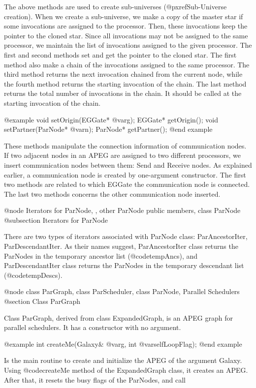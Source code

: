 The above methods are used to create sub-universes 
(@pxref{Sub-Universe creation}). When we create a sub-universe, we make a
copy of the master star if some invocations are assigned to the processor.
Then, these invocations keep the pointer to the cloned star. Since
all invocations may not be assigned to the same processor, we maintain
the list of invocations assigned to the given processor. The first and
second methods set and get the pointer to the cloned star. The first method
also make a chain of the invocations assigned to the same processor.
The third method returns the next invocation chained from the current node,
while the fourth method returns the starting invocation of the chain. The
last method returns the total number of invocations in the chain. It should
be called at the starting invocation of the chain.

@example
void setOrigin(EGGate* @var{g});
EGGate* getOrigin();
void setPartner(ParNode* @var{n});
ParNode* getPartner();
@end example

These methods manipulate the connection information of communication nodes.
If two adjacent nodes in an APEG are assigned to two different processors,
we insert communication nodes between them: Send and Receive nodes. As
explained earlier, a communication node is created by one-argument
constructor. The
first two methods are related to which EGGate the communication node is
connected. The last two methods concerns the other communication node
inserted.

@node Iterators for ParNode, , other ParNode public members, class ParNode
@subsection Iterators for ParNode

There are two types of iterators associated with ParNode class: 
ParAncestorIter, ParDescendantIter. As their names suggest, ParAncestorIter
class returns the ParNodes in the temporary ancestor list (@code{tempAncs}),
and ParDescendantIter class returns the ParNodes in the temporary
descendant list (@code{tempDescs}). 

@node class ParGraph, class ParScheduler, class ParNode, Parallel Schedulers
@section Class ParGraph

Class ParGraph, derived from class ExpandedGraph, is an APEG graph for
parallel schedulers. It has a constructor with no argument. 

@example
int createMe(Galaxy& @var{g}, int @var{selfLoopFlag});
@end example

Is the main routine to create and initialize the APEG of the
argument Galaxy. Using @code{createMe} method of the ExpandedGraph
class, it creates an APEG. After that, it resets the busy flags of
the ParNodes, and call

